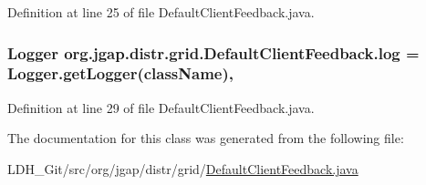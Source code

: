 Definition at line 25 of file Default\-Client\-Feedback.\-java.

\hypertarget{classorg_1_1jgap_1_1distr_1_1grid_1_1_default_client_feedback_ad788aec5ce0e5a98a866894dd44208f4}{
\subsubsection[{log}]{\setlength{\rightskip}{0pt plus 5cm}Logger org.\-jgap.\-distr.\-grid.\-Default\-Client\-Feedback.\-log = Logger.\-get\-Logger({\bf class\-Name})\hspace{0.3cm}{\ttfamily [static]}, {\ttfamily [private]}}}\label{classorg_1_1jgap_1_1distr_1_1grid_1_1_default_client_feedback_ad788aec5ce0e5a98a866894dd44208f4}


Definition at line 29 of file Default\-Client\-Feedback.\-java.



The documentation for this class was generated from the following file\-:\begin{DoxyCompactItemize}
\item 
L\-D\-H\-\_\-\-Git/src/org/jgap/distr/grid/\hyperlink{_default_client_feedback_8java}{Default\-Client\-Feedback.\-java}\end{DoxyCompactItemize}

